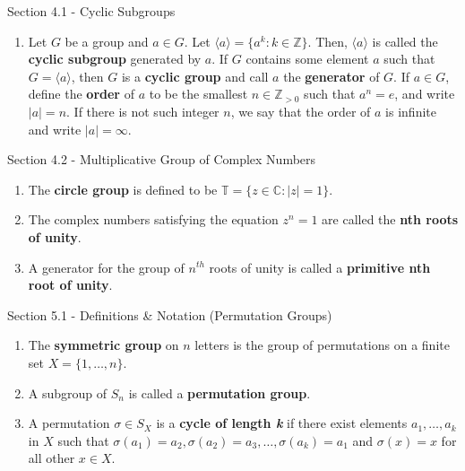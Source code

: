 \documentclass[12pt]{article}
\theoremstyle{definition}
\theoremstyle{named}
\begin{document}
\begin{section}{Section 4.1 - Cyclic Subgroups}
    \begin{enumerate}
        \item Let $G$ be a group and $a \in G$. Let $\langle a \rangle = \{a^k: k \in \mathbb{Z}\}$. Then, $\langle a \rangle$ is called the \textbf{cyclic subgroup} generated by $a$. If $G$ contains some element $a$ such that $G = \langle a \rangle$, then $G$ is a \textbf{cyclic group} and call $a$ the \textbf{generator} of $G$. If $a \in G$, define the \textbf{order} of $a$ to be the smallest $n \in \mathbb{Z}_{>0}$ such that $a^n = e$, and write $|a| = n$. If there is not such integer $n$, we say that the order of $a$ is infinite and write $|a| = \infty$. 
    \end{enumerate}
\end{section}

\begin{section}{Section 4.2 - Multiplicative Group of Complex Numbers}
    \begin{enumerate}
        \item The \textbf{circle group} is defined to be $\mathbb{T} = \{z \in \mathbb{C}: |z|=1\}$. 
        \item The complex numbers satisfying the equation $z^n=1$ are called the \textbf{nth roots of unity}. 
        \item A generator for the group of $n^{th}$ roots of unity is called a \textbf{primitive nth root of unity}. 
    \end{enumerate}
\end{section}

\begin{section}{Section 5.1 - Definitions \& Notation (Permutation Groups)}
    \begin{enumerate}
        \item The \textbf{symmetric group} on $n$ letters is the group of permutations on a finite set $X = \{1,\dots,n\}$. 
        \item A subgroup of $S_n$ is called a \textbf{permutation group}. 
        \item A permutation $\sigma \in S_X$ is a \textbf{cycle of length \textit{k}} if there exist elements $a_1,\dots,a_k$ in $X$ such that $\sigma(a_1)=a_2, \sigma(a_2)=a_3,\dots,\sigma(a_k)=a_1$ and $\sigma(x)=x$ for all other $x \in X$. 
    \end{enumerate}
\end{section}
\end{document}
